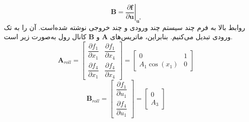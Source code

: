 \begin{equation}
	\boldsymbol B = \left.\dfrac{\partial \boldsymbol f}{\partial \boldsymbol u}\right\vert_{\boldsymbol{u^*}}
\end{equation}
روابط بالا به فرم چند سیستم چند ورودی و چند خروجی نوشته ‌شده‌است. آن را به تک ورودی تبدیل می‌کنیم.
بنابراین، ماتریس‌های $\boldsymbol{A}$ و $\boldsymbol{B}$ کانال رول به‌صورت زیر است.
\begin{equation}
	\boldsymbol A_{roll} = \begin{bmatrix}
		\dfrac{\partial  f_1}{\partial  x_1}& \dfrac{\partial  f_1}{\partial  x_4}
		\\[1em]
		\dfrac{\partial  f_4}{\partial  x_1}& \dfrac{\partial  f_4}{\partial  x_4}
	\end{bmatrix} = 
	\begin{bmatrix}
		0 & 1\\
		A_1\cos(x_1) & 0
	\end{bmatrix}
\end{equation}
\begin{equation}
	\boldsymbol B_{roll} = \begin{bmatrix}
		\dfrac{\partial  f_1}{\partial  u_1}
		\\[1em]
		\dfrac{\partial  f_4}{\partial  u_1}
	\end{bmatrix} = 
	\begin{bmatrix}
		0\\
		A_3
	\end{bmatrix}
\end{equation}

